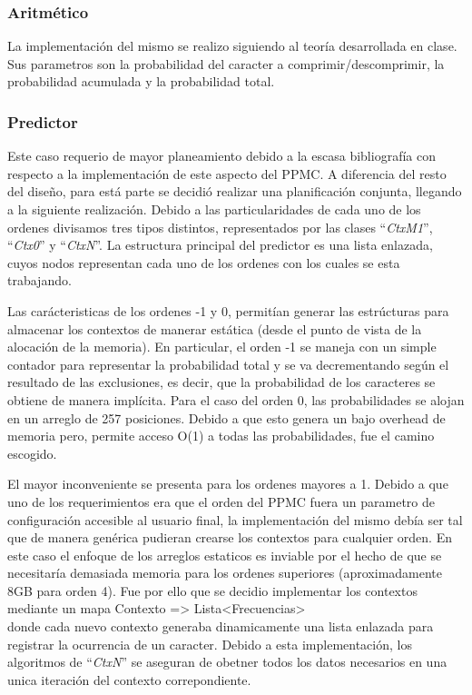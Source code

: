 \documentclass{article}
\begin{document}
\subsubsection{Aritmético}
\medskip

	La implementación del mismo se realizo siguiendo al teoría desarrollada en clase. Sus parametros son la probabilidad del caracter a comprimir/descomprimir, la probabilidad acumulada y la probabilidad total. 

\bigskip



\subsubsection{Predictor}
\medskip

	Este caso requerio de mayor planeamiento debido a la escasa bibliografía con respecto a la implementación de este aspecto del PPMC. A diferencia del resto del diseño, para está parte se decidió realizar una planificación conjunta, llegando a la siguiente realización. Debido a las particularidades de cada uno de los ordenes divisamos tres tipos distintos, representados por las clases ``\textit{CtxM1}'', ``\textit{Ctx0}'' y ``\textit{CtxN}''. La estructura principal del predictor es una lista enlazada, cuyos nodos representan cada uno de los ordenes con los cuales se esta trabajando.
	\par
	Las carácteristicas de los ordenes -1 y 0, permitían generar las estrúcturas para almacenar los contextos de manerar estática (desde el punto de vista de la alocación de la memoria). En particular, el orden -1 se maneja con un simple contador para representar la probabilidad total y se va decrementando según el resultado de las exclusiones, es decir, que la probabilidad de los caracteres se obtiene de manera implícita. Para el caso del orden 0, las probabilidades se alojan en un arreglo de 257 posiciones. Debido a que esto genera un bajo overhead de memoria pero, permite acceso O(1) a todas las probabilidades, fue el camino escogido.
	\par
	El mayor inconveniente se presenta para los ordenes mayores a 1. Debido a que uno de los requerimientos era que el orden del PPMC fuera un parametro de configuración accesible al usuario final, la implementación del mismo debía ser tal que de manera genérica pudieran crearse los contextos para cualquier orden. En este caso el enfoque de los arreglos estaticos es inviable por el hecho de que se necesitaría demasiada memoria para los ordenes superiores (aproximadamente 8GB para orden 4).
	Fue por ello que se decidio implementar los contextos mediante un mapa {\ttfamily\footnotesize Contexto => Lista<Frecuencias> \\} donde cada nuevo contexto generaba dinamicamente una lista enlazada para registrar la ocurrencia de un caracter. Debido a esta implementación, los algoritmos de ``\textit{CtxN}'' se aseguran de obetner todos los datos necesarios en una unica iteración del contexto correpondiente.
	\par
\end{document}
